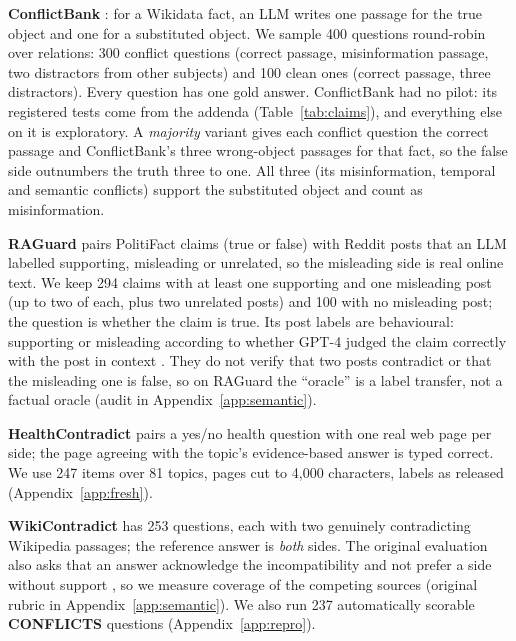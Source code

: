 \textbf{ConflictBank} \citep{su2024conflictbank}: for a Wikidata fact, an LLM writes one passage for the true
object and one for a substituted object. We sample 400 questions round-robin over relations: 300 conflict questions
(correct passage, misinformation passage, two distractors from other subjects) and 100 clean ones (correct passage,
three distractors). Every question has one gold answer. ConflictBank had no pilot: its registered tests come from the addenda (Table~\ref{tab:claims}), and everything else on it is exploratory. A
\emph{majority} variant gives each conflict question the correct passage and ConflictBank's three wrong-object
passages for that fact, so the false side outnumbers the truth three to one. All three (its misinformation, temporal
and semantic conflicts) support the substituted object and count as misinformation.

\textbf{RAGuard} \citep{zeng2025raguard} pairs PolitiFact claims (true or false) with Reddit posts that an LLM
labelled supporting, misleading or unrelated, so the misleading side is real online text. We keep 294 claims with at
least one supporting and one misleading post (up to two of each, plus two unrelated posts) and 100 with no
misleading post; the question is whether the claim is true. Its post labels are behavioural: supporting or misleading according to whether GPT-4 judged the claim correctly with the post in context \citep[\S3.3]{zeng2025raguard}. They do not verify that two posts contradict or that the misleading one is false, so on RAGuard the ``oracle'' is a label transfer, not a factual oracle (audit in Appendix~\ref{app:semantic}).

\textbf{HealthContradict} \citep{zhang2026healthcontradict} pairs a yes/no health question with one real web page per side; the page agreeing with the topic's evidence-based answer is typed correct. We use 247 items over 81 topics, pages cut to 4,000 characters, labels as released (Appendix~\ref{app:fresh}).

\textbf{WikiContradict} \citep{hou2024wikicontradict} has 253 questions, each with two genuinely contradicting
Wikipedia passages; the reference answer is \emph{both} sides. The original evaluation also asks that an answer acknowledge the incompatibility and not prefer a side without support \citep[\S3.4]{hou2024wikicontradict}, so we measure coverage of the competing sources (original rubric in Appendix~\ref{app:semantic}). We also run 237 automatically scorable
\textbf{CONFLICTS} \citep{cattan2025conflicts} questions (Appendix~\ref{app:repro}).

